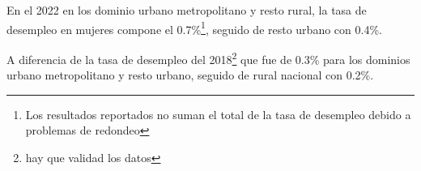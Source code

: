 En el 2022 en los dominio urbano metropolitano y resto rural, la tasa de desempleo en mujeres compone el 0.7\%\footnote{Los resultados reportados no suman el total de la tasa de desempleo debido a problemas de redondeo}, seguido de resto urbano con 0.4\%.

A diferencia de la tasa de desempleo del 2018\footnote{hay que validad los datos} que fue de 0.3\% para los dominios urbano metropolitano y resto urbano, seguido de rural nacional con 0.2\%. 
